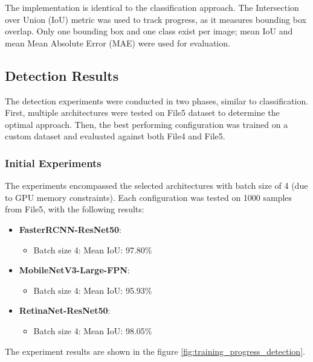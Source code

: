 \documentclass[conference]{IEEEtran}
\begin{document}
The implementation is identical to the classification approach. The Intersection over Union (IoU) metric was used to track progress, as
it measures bounding box overlap. Only one bounding box and one class exist per image; mean IoU and mean Mean Absolute Error (MAE) were
used for evaluation.

\subsection{Detection Results}

The detection experiments were conducted in two phases, similar to classification. First, multiple architectures were tested on File5
dataset to determine the optimal approach. Then, the best performing configuration was trained on a custom dataset and
evaluated against both File4 and File5.

\subsubsection{Initial Experiments}

The experiments encompassed the selected architectures with batch size of 4 (due to GPU memory constraints). Each
configuration was tested on 1000 samples from File5, with the following results:

\begin{itemize}
  \item \textbf{FasterRCNN-ResNet50}:
    \begin{itemize}
        \item Batch size 4: Mean IoU: 97.80\%
    \end{itemize}
    
  \item \textbf{MobileNetV3-Large-FPN}:
    \begin{itemize}
        \item Batch size 4: Mean IoU: 95.93\% 
    \end{itemize}

  \item \textbf{RetinaNet-ResNet50}:
    \begin{itemize}
        \item Batch size 4: Mean IoU: 98.05\%
    \end{itemize}
\end{itemize}

The experiment results are shown in the figure \ref{fig:training_progress_detection}.
\end{document}
